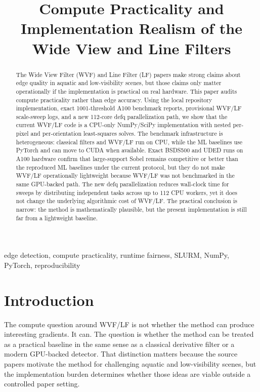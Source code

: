 \documentclass[conference]{IEEEtran}
\begin{document}
\title{Compute Practicality and Implementation Realism of the Wide View and Line Filters}

\author{
}

\maketitle

\begin{abstract}
The Wide View Filter (WVF) and Line Filter (LF) papers make strong claims about edge quality in aquatic and low-visibility scenes, but those claims only matter operationally if the implementation is practical on real hardware. This paper audits compute practicality rather than edge accuracy. Using the local repository implementation, exact 1001-threshold A100 benchmark reports, provisional WVF/LF scale-sweep logs, and a new 112-core defq parallelization path, we show that the current WVF/LF code is a CPU-only NumPy/SciPy implementation with nested per-pixel and per-orientation least-squares solves. The benchmark infrastructure is heterogeneous: classical filters and WVF/LF run on CPU, while the ML baselines use PyTorch and can move to CUDA when available. Exact BSDS500 and UDED runs on A100 hardware confirm that large-support Sobel remains competitive or better than the reproduced ML baselines under the current protocol, but they do not make WVF/LF operationally lightweight because WVF/LF was not benchmarked in the same GPU-backed path. The new defq parallelization reduces wall-clock time for sweeps by distributing independent tasks across up to 112 CPU workers, yet it does not change the underlying algorithmic cost of WVF/LF. The practical conclusion is narrow: the method is mathematically plausible, but the present implementation is still far from a lightweight baseline.
\end{abstract}

\begin{IEEEkeywords}
edge detection, compute practicality, runtime fairness, SLURM, NumPy, PyTorch, reproducibility
\end{IEEEkeywords}

\section{Introduction}
The compute question around WVF/LF is not whether the method can produce interesting gradients. It can. The question is whether the method can be treated as a practical baseline in the same sense as a classical derivative filter or a modern GPU-backed detector. That distinction matters because the source papers motivate the method for challenging aquatic and low-visibility scenes, but the implementation burden determines whether those ideas are viable outside a controlled paper setting.
\end{document}
